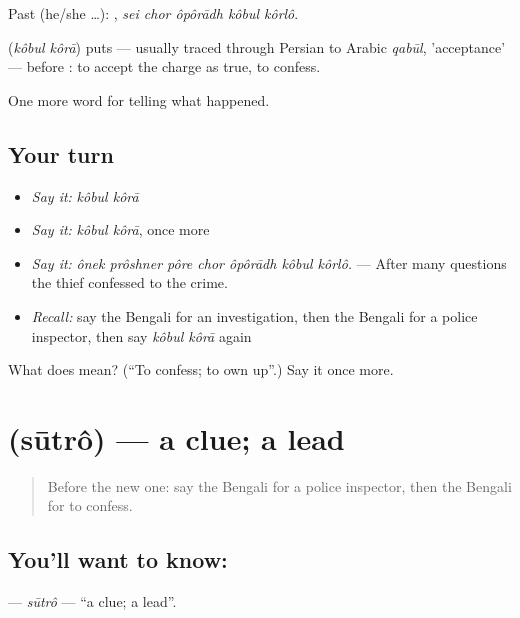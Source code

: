 Past (he/she …):     , \emph{sei chor ôpôrādh kôbul kôrlô}.

\begin{cousinweb}
\textbf{ } (\emph{kôbul kôrā}) puts  — usually traced through Persian to Arabic \emph{qabūl}, 'acceptance' — before : to accept the charge as true, to confess.
\end{cousinweb}

\begin{grammarlens}[title={What you've built}]
One more word for telling what happened.
\end{grammarlens}

\subsection*{Your turn}
\begin{itemize}
\raggedright
  \item \emph{Say it:} \emph{kôbul kôrā}
  \item \emph{Say it:} \emph{kôbul kôrā}, once more
  \item \emph{Say it:} \emph{ônek prôshner pôre chor ôpôrādh kôbul kôrlô.} — After many questions the thief confessed to the crime.
  \item \emph{Recall:} say the Bengali for an investigation, then the Bengali for a police inspector, then say \emph{kôbul kôrā} again
\end{itemize}

\begin{tcolorbox}[breakable,colback=teal!4,colframe=teal!35!black,title={Before you move on}]
What does   mean? (\textquotedblleft{}To confess; to own up\textquotedblright{}.) Say it once more.
\end{tcolorbox}
\section[\texorpdfstring{\bn{সূত্র} (sūtrô)}{সূত্র (sūtrô)}]{ (sūtrô) — a clue; a lead}

\label{lesson:BN-C284-sutro}



\begin{quote}
Before the new one: say the Bengali for a police inspector, then the Bengali for to confess.
\end{quote}

\subsection*{You'll want to know: }
\textbf{} — \emph{sūtrô} — \textquotedblleft{}a clue; a lead\textquotedblright{}.

